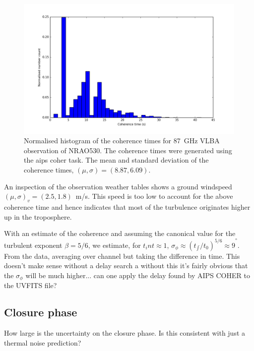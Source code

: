 \begin{figure}
\begin{center}
\includegraphics[width=\columnwidth]{Images/Coherence_time_NRAO530ff}
\caption{Normalised histogram of the coherence times for 87~GHz VLBA observation of NRAO530. The coherence times were generated using the {\sc aips} {\sc coher} task. The mean and standard deviation of the coherence times, $(\mu, \sigma) = (8.87,6.09)$. \label{fig:coherence}%
}
\end{center}
\end{figure}


An inspection of the observation weather tables shows a ground windspeed  $(\mu, \sigma)_v = (2.5, 1.8)$~m/s. This speed is too low to account for the above coherence time and hence indicates that most of the turbulence originates higher up in the troposphere.

With an estimate of the coherence and assuming the canonical value for the turbulent exponent $\beta = 5/6$, we estimate, for $t_int \approx 1$, ${\sigma_\phi \approx (t_{\int}/t_0)^{5/6} \approx 9}^\circ$. From the data, averaging over channel but taking the difference in time. This doesn't make sense without a delay search a without this it's fairly obvious that the $\sigma_\phi$ will be much higher... can one apply the delay found by AIPS COHER to the UVFITS file? 

\subsection{Closure phase} 

How large is the uncertainty on the closure phase. Is this consistent with just a thermal noise prediction?


